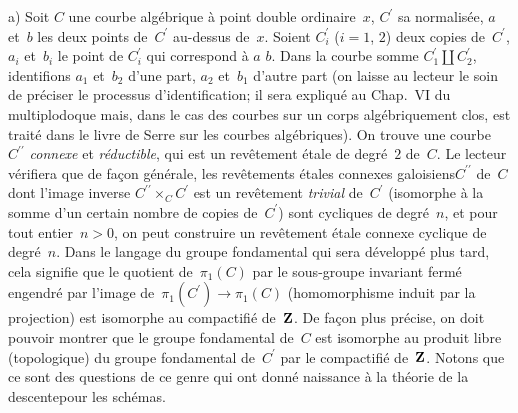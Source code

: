 a) Soit $C$ une courbe alg\'ebrique \`a point double
ordinaire~$x$, $C^\prime$ sa normalis\'ee, $a$ et~$b$ les deux
points de~$C^\prime$ au-dessus de~$x$. Soient $C_i^\prime$ ($i=1$,
$2$) deux copies de~$C^\prime$, $a_i$ et~$b_i$ le point de
$C_i^\prime$ qui correspond \`a $a$ \resp $b$. Dans la courbe somme
$C_1^\prime \amalg C_2^\prime$, identifions
$a_1$
et~$b_2$ d'une part, $a_2$ et~$b_1$ d'autre part (on laisse au lecteur
le soin de pr\'eciser le processus d'identification; il sera
expliqu\'e au Chap.\, VI du multiplodoque mais, dans le cas des
courbes sur un corps alg\'ebriquement clos, est trait\'e dans le
livre de Serre sur les courbes alg\'ebriques). On trouve une courbe
$C^{\prime\prime}$ \emph{connexe} et \emph{réductible}, qui est un
rev\^etement \'etale de degr\'e~$2$ de~$C$. Le lecteur
v\'erifiera que de fa\c con g\'en\'erale, les rev\^etements
\'etales connexes \og galoisiens\fg $C^{\prime\prime}$ de~$C$ dont
l'image inverse $C^{\prime\prime} \times_C C^\prime$ est un
rev\^etement \emph{trivial} de~$C^\prime$ (\ie isomorphe \`a la
somme d'un certain nombre de copies de~$C^\prime$) sont \og cycliques\fg
de degr\'e~$n$, et pour tout entier~$n>0$, on peut construire un
rev\^etement \'etale connexe cyclique de degr\'e~$n$. Dans le
langage du groupe fondamental qui sera d\'evelopp\'e plus tard,
cela signifie que le quotient de~$\pi_1(C)$ par le sous-groupe
invariant ferm\'e engendr\'e par l'image de~$\pi_1(C^\prime) \to
\pi_1(C)$ (homomorphisme induit par la projection) est isomorphe au
compactifi\'e de~$\mathbf{Z}$. De fa\c con plus pr\'ecise, on doit
pouvoir montrer que le groupe fondamental de~$C$ est isomorphe au
produit libre (topologique) du groupe fondamental
de~$C^\prime$
par le compactifi\'e de~$\mathbf{Z}$. Notons que ce sont des questions
de ce genre qui ont donn\'e naissance \`a la \og th\'eorie de la
descente\fg pour les sch\'emas.

